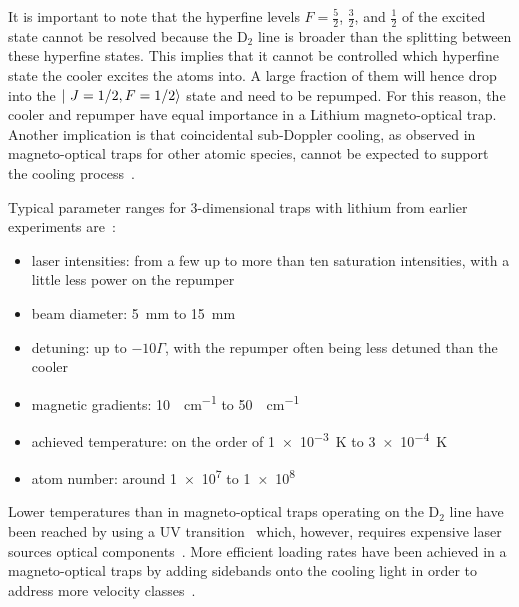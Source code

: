It is important to note that the hyperfine levels $F = \frac{5}{2}$, $\frac{3}{2}$, and $\frac{1}{2}$ of the excited state cannot be resolved because the D$_2$ line is broader than the splitting between these hyperfine states. This implies that it cannot be controlled which hyperfine state the cooler excites the atoms into. A large fraction of them will hence drop into the $\Ket{~J=1/2, F=1/2}$ state and need to be repumped. For this reason, the cooler and repumper have equal importance in a Lithium magneto-optical trap. Another implication is that coincidental sub-Doppler cooling, as observed in magneto-optical traps for other atomic species, cannot be expected to support the cooling process~\cite{grier_lambda-enhanced_2013}.

Typical parameter ranges for 3-dimensional traps with lithium from earlier experiments are~\cite{
    tiecke_high-flux_2009,
    kawanaka_decay_1993,
    schunemann_magneto-optic_1998,
    mewes_simultaneous_1999,
    hilker_laser_2012,
    kerkmann_novel_2019,
    ladouceur_compact_2009,
    chen_lithium-cesium_2021,    
    burchianti_efficient_2014,
    li_enhanced_2015,
}:
\begin{itemize}
    \item laser intensities: from a few up to more than ten saturation intensities, with a little less power on the repumper
    \item beam diameter: \SI{5}{\milli\meter} to \SI{15}{\milli\meter}
    \item detuning: up to $-10 \Gamma$, with the repumper often being less detuned than the cooler
    \item magnetic gradients: \SI{10}{\gauss\per\centi\meter} to \SI{50}{\gauss\per\centi\meter}
    \item achieved temperature: on the order of \SI{1e-3}{\kelvin} to \SI{3e-4}{\kelvin}
    \item atom number: around \SI{1e7}{} to \SI{1e8}{}
\end{itemize}

Lower temperatures than in magneto-optical traps operating on the D$_2$ line have been reached by using a UV transition~\cite{duarte_all-optical_2011,omran_microscopic_2015} which, however, requires expensive laser sources optical components~\cite{burchianti_efficient_2014}. More efficient loading rates have been achieved in a magneto-optical traps by adding sidebands onto the cooling light in order to address more velocity classes~\cite{li_enhanced_2015}.


